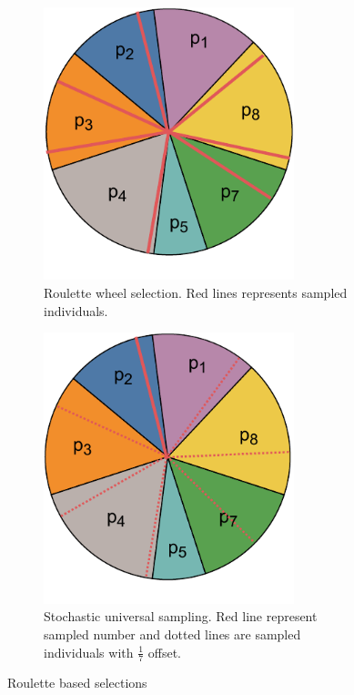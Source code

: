 \begin{figure}
    \begin{subfigure}[t]{0.47\textwidth}
        \includegraphics[width=0.8\textwidth]{img/master_roulettewheel.pdf}
        \caption{Roulette wheel selection. Red lines represents sampled individuals.}
        \label{fig:roulettewheelselection}
    \end{subfigure}
    \hfill
    \begin{subfigure}[t]{0.47\textwidth}
        \includegraphics[width=0.8\textwidth]{img/master_stochasticuniversalsampling.pdf}
        \caption{Stochastic universal sampling. Red line represent sampled number and dotted lines are sampled individuals with $\frac{1}{7}$ offset.}
        \label{fig:USB}
    \end{subfigure}
    \caption{Roulette based selections}
\end{figure}

